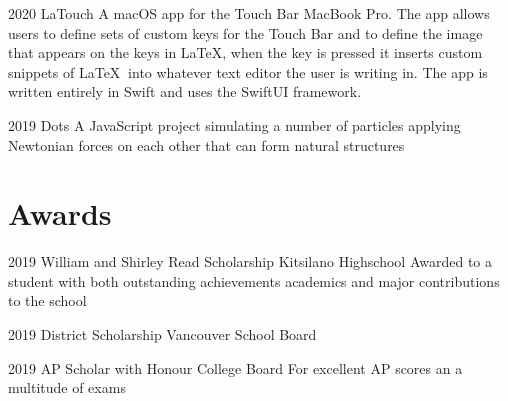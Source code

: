 \documentclass[]{style}
\begin{document}
\begin{entrylist}


\entry
{2020}
{LaTouch}
{}
{A macOS app for the Touch Bar MacBook Pro. The app allows users to define sets of custom keys for the Touch Bar and to define the image that appears on the keys in \LaTeX, when the key is pressed it inserts custom snippets of \LaTeX $\:$ into whatever text editor the user is writing in. The app is written entirely in Swift and uses the SwiftUI framework.}


\entry
{2019}
{Dots}
{}
{A JavaScript project simulating a number of particles applying Newtonian forces on each other that can form natural structures}


\end{entrylist}



\section{Awards}

\begin{entrylist}


\entry
{2019}
{William and Shirley Read Scholarship}
{Kitsilano Highschool}
{Awarded to a student with both outstanding achievements academics and major contributions to the school}


\entry
{2019}
{District Scholarship}
{Vancouver School Board}
{}

\entry
{2019}
{AP Scholar with Honour}
{College Board}
{For excellent AP scores an a multitude of exams}


\end{entrylist}
\end{document}

